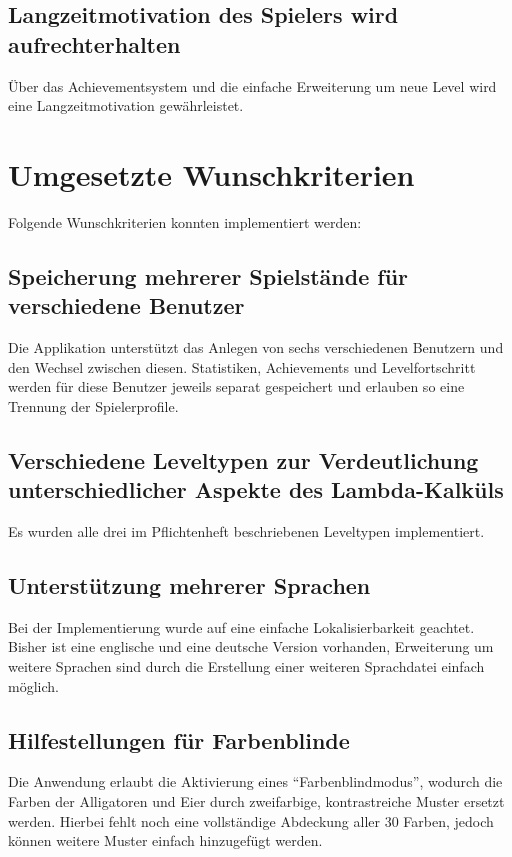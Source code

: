 \subsection{Langzeitmotivation des Spielers wird aufrechterhalten}

Über das Achievementsystem und die einfache Erweiterung um neue Level wird eine Langzeitmotivation gewährleistet.


\section{Umgesetzte Wunschkriterien}

Folgende Wunschkriterien konnten implementiert werden:

\subsection{Speicherung mehrerer Spielstände für verschiedene Benutzer}

Die Applikation unterstützt das Anlegen von sechs verschiedenen Benutzern und den Wechsel zwischen diesen.
Statistiken, Achievements und Levelfortschritt werden für diese Benutzer jeweils separat gespeichert und erlauben so eine Trennung der Spielerprofile.

\subsection{Verschiedene Leveltypen zur Verdeutlichung unterschiedlicher Aspekte des Lambda-Kalküls}

Es wurden alle drei im Pflichtenheft beschriebenen Leveltypen implementiert.

\subsection{Unterstützung mehrerer Sprachen}

Bei der Implementierung wurde auf eine einfache Lokalisierbarkeit geachtet.
Bisher ist eine englische und eine deutsche Version vorhanden, Erweiterung um weitere Sprachen sind durch die Erstellung einer weiteren Sprachdatei einfach möglich.

\subsection{Hilfestellungen für Farbenblinde}

Die Anwendung erlaubt die Aktivierung eines "`Farbenblindmodus"', wodurch die Farben der Alligatoren und Eier durch zweifarbige, kontrastreiche Muster ersetzt werden.
Hierbei fehlt noch eine vollständige Abdeckung aller 30 Farben, jedoch können weitere Muster einfach hinzugefügt werden.

